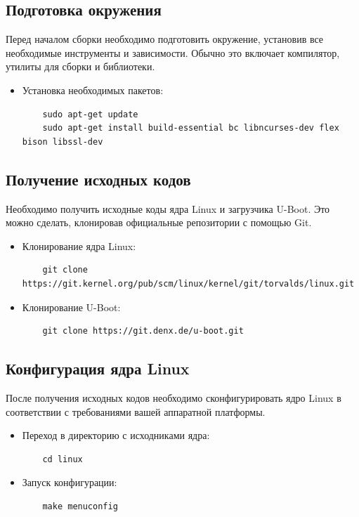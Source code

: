 \documentclass[16pt]{article}
\begin{document}
\subsection{Подготовка окружения}

Перед началом сборки необходимо подготовить окружение, установив все необходимые инструменты и зависимости. Обычно это включает компилятор, утилиты для сборки и библиотеки.

\begin{itemize}
    \item Установка необходимых пакетов:
    \begin{verbatim}
    sudo apt-get update
    sudo apt-get install build-essential bc libncurses-dev flex bison libssl-dev
    \end{verbatim}
\end{itemize}

\subsection{Получение исходных кодов}

Необходимо получить исходные коды ядра Linux и загрузчика U-Boot. Это можно сделать, клонировав официальные репозитории с помощью Git.

\begin{itemize}
    \item Клонирование ядра Linux:
    \begin{verbatim}
    git clone https://git.kernel.org/pub/scm/linux/kernel/git/torvalds/linux.git
    \end{verbatim}

    \item Клонирование U-Boot:
    \begin{verbatim}
    git clone https://git.denx.de/u-boot.git
    \end{verbatim}
\end{itemize}

\subsection{Конфигурация ядра Linux}

После получения исходных кодов необходимо сконфигурировать ядро Linux в соответствии с требованиями вашей аппаратной платформы.

\begin{itemize}
    \item Переход в директорию с исходниками ядра:
    \begin{verbatim}
    cd linux
    \end{verbatim}

    \item Запуск конфигурации:
    \begin{verbatim}
    make menuconfig
    \end{verbatim}
\end{itemize}
\end{document}
